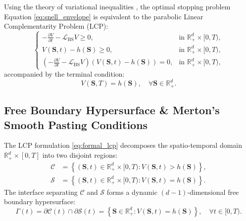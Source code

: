 \documentclass[11pt,a4paper]{article}
\begin{document}
Using the theory of variational inequalities \cite{cryer1971solution, forsyth2002quadratic}, the optimal stopping problem Equation \eqref{eq:snell_envelope} is equivalent to the parabolic Linear Complementarity Problem (LCP):
\begin{equation}
\label{eq:formal_lcp}
\begin{cases}
-\frac{\partial V}{\partial t} - \mathcal{L}_{\text{BS}} V \ge 0, & \text{in } \mathbb{R}_+^d \times [0, T), \\
V(\mathbf{S}, t) - h(\mathbf{S}) \ge 0, & \text{in } \mathbb{R}_+^d \times [0, T), \\
\left( -\frac{\partial V}{\partial t} - \mathcal{L}_{\text{BS}} V \right) \left( V(\mathbf{S}, t) - h(\mathbf{S}) \right) = 0, & \text{in } \mathbb{R}_+^d \times [0, T),
\end{cases}
\end{equation}
accompanied by the terminal condition:
\begin{equation}
\label{eq:terminal_condition}
V(\mathbf{S}, T) = h(\mathbf{S}), \quad \forall \mathbf{S} \in \mathbb{R}_+^d.
\end{equation}

\subsection{Free Boundary Hypersurface \& Merton's Smooth Pasting Conditions}
The LCP formulation \eqref{eq:formal_lcp} decomposes the spatio-temporal domain $\mathbb{R}_+^d \times [0, T]$ into two disjoint regions:
\begin{align}
\label{eq:continuation_domain}
\mathcal{C} &= \left\{ (\mathbf{S}, t) \in \mathbb{R}_+^d \times [0, T) : V(\mathbf{S}, t) > h(\mathbf{S}) \right\}, \\
\label{eq:stopping_domain}
\mathcal{S} &= \left\{ (\mathbf{S}, t) \in \mathbb{R}_+^d \times [0, T) : V(\mathbf{S}, t) = h(\mathbf{S}) \right\}.
\end{align}
The interface separating $\mathcal{C}$ and $\mathcal{S}$ forms a dynamic $(d-1)$-dimensional free boundary hypersurface:
\begin{equation}
\label{eq:free_boundary_def}
\Gamma(t) = \partial \mathcal{C}(t) \cap \partial \mathcal{S}(t) = \left\{ \mathbf{S} \in \mathbb{R}_+^d : V(\mathbf{S}, t) = h(\mathbf{S}) \right\}, \quad \forall t \in [0, T).
\end{equation}
\end{document}

